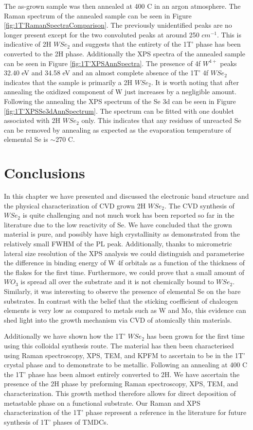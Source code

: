 The as-grown sample was then annealed at 400 {\degree}C in an argon atmosphere. The Raman spectrum of the annealed sample can be seen in Figure \ref{fig:1T'RamanSpectraComparison}. The previously unidentified peaks are no longer present except for the two convoluted peaks at around 250 $cm^{-1}$. This is indicative of 2H $WSe_2$ and suggests that the entirety of the 1T' phase has been converted to the 2H phase. Additionally the XPS spectra of the annealed sample can be seen in Figure \ref{fig:1T'XPSAnnSpectra}. The presence of 4f $W^{4+}$ peaks 32.40 eV and 34.58 eV and an almost complete absence of the 1T' 4f $WSe_2$ indicates that the sample is primarily a 2H $WSe_2$. It is worth noting that after annealing the oxidized component of W just increases by a negligible amount. Following the annealing the XPS spectrum of the Se 3d can be seen in Figure \ref{fig:1T'XPSSe3dAnnSpectrum}. The spectrum can be fitted with one doublet associated with 2H $WSe_2$ only. This indicates that any residues of unreacted Se can be removed by annealing as expected as the evaporation temperature of elemental Se is $\sim$270 {\degree}C. 

\section{Conclusions}

In this chapter we have presented and discussed the electronic band structure and the physical characterization of CVD grown 2H $WSe_2$. The CVD synthesis of $WSe_2$ is quite challenging and not much work has been reported so far in the literature due to the low reactivity of Se. We have concluded that the grown material is pure, and possibly have high crystallinity as demonstrated from the relatively small FWHM of the PL peak. Additionally, thanks to micrometric lateral size resolution of the XPS analysis we could distinguish and parameterise the difference in binding energy of W 4f orbitals as a function of the thickness of the flakes for the first time. Furthermore, we could prove that a small amount of $WO_3$ is spread all over the substrate and it is not chemically bound to $WSe_2$. Similarly, it was interesting to observe the presence of elemental Se on the bare substrates. In contrast with the belief that the sticking coefficient of chalcogen elements is very low as compared to metals such as W and Mo, this evidence can shed light into the growth mechanism via CVD of atomically thin materials.

Additionally we have shown how the 1T' $WSe_2$ has been grown for the first time using this colloidal synthesis route. The material has then been characterised using Raman spectroscopy, XPS, TEM, and KPFM to ascertain to be in the 1T’ crystal phase and to demonstrate  to be metallic. Following an annealing at 400 {\degree}C the 1T' phase has been almost entirely converted to 2H. We have ascertain the presence of the 2H phase by preforming Raman spectroscopy, XPS, TEM, and characterization. This growth method therefore allows for direct deposition of metastable phase on a functional substrate. Our Raman and XPS characterization of the 1T’ phase represent a reference in the literature for future synthesis of 1T’ phases of TMDCs.